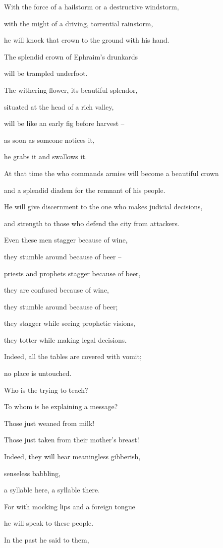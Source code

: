 {\par }{\Q With the force of a hailstorm
or a destructive
windstorm,
\par }{\Q with the might of a driving,
torrential
rainstorm,
\par }{\Q he will knock that crown
to the ground
with his hand.
\par }{\Q {}The splendid
crown
of Ephraim’s
drunkards
\par }{\Q will be trampled
underfoot.
\par }{\Q {}The withering
flower,
its beautiful
splendor,
\par }{\Q situated at the head
of a rich
valley,
\par }{\Q will be like an early fig
before
harvest
–
\par }{\Q as
soon as someone notices
it,
\par }{\Q he grabs
it and swallows it.
\par }{\Q {}At that time
the {}
who commands armies
will become
a beautiful
crown
\par }{\Q and a splendid
diadem
for the remnant
of his people.
\par }{\Q {}He will give discernment to the one who
makes judicial decisions,
\par }{\Q and strength to those who defend the city
from attackers.
\par }{\Q {}Even
these
men stagger
because of wine,
\par }{\Q they stumble around
because of beer
–
\par }{\Q priests
and prophets
stagger
because of beer,
\par }{\Q they are confused
because
of wine,
\par }{\Q they stumble around
because
of beer;
\par }{\Q they stagger
while seeing prophetic visions,
\par }{\Q they totter
while making legal decisions.
\par }{\Q {}Indeed,
all
the tables
are covered
with vomit;
\par }{\Q no
place
is untouched.
\par }{\Q {}Who
is the
{} trying to teach?
\par }{\Q To whom
is he explaining
a message?

\par }{\Q Those just weaned
from milk!
\par }{\Q Those just taken from their mother’s
breast!
\par }{\Q {}Indeed,
they will hear meaningless
gibberish,
\par }{\Q senseless
babbling,
\par }{\Q a syllable here,
a syllable there.
\par }{\Q {}For
with mocking
lips
and a foreign
tongue
\par }{\Q he will speak
to
these
people.
\par }{\Q {}In the past he said
to
them,

}

